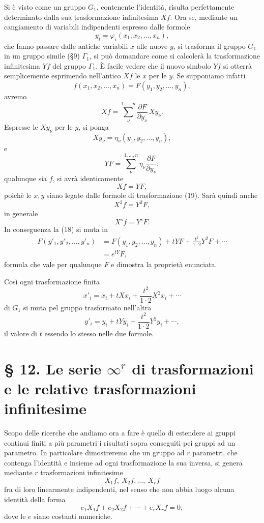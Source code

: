 \documentclass[11pt]{book}
\begin{document}
Si è visto come un gruppo $G_1$, contenente l'identità, risulta perfettamente determinato dalla sua trasformazione infinitesima $Xf$. Ora se, mediante un cangiamento di variabili indipendenti espresso dalle formole
\begin{equation*}\tag{19}
 y_i=\varphi_i(x_1,x_2,\ldots,x_n),
\end{equation*}
che fanno passare dalle antiche variabili $x$ alle nuove $y$, si trasforma il gruppo $G_1$ in un gruppo simile (\S{}9) $\Gamma_1$, si può domandare come si calcolerà la trasformazione infinitesima $Yf$ del gruppo $\Gamma_1$. È facile vedere che il nuovo simbolo $Yf$ si otterrà semplicemente esprimendo nell'antico $Xf$ le $x$ per le $y$. Se supponiamo infatti
\[
 f(x_1,x_2,\ldots,x_n)=F(y_1,y_2,\ldots,y_n),
\]
avremo
\[
 Xf=\sum\limits_\nu^{1,\ldots,n}\frac{\partial F}{\partial y_\nu}\,Xy_\nu.
\]
Espresse le $Xy_\nu$ per le $y$, si ponga
\[
 Xy_\nu=\eta_\nu(y_1,y_2,\ldots,y_n),
\]
e
\[
 YF=\sum\limits_\nu^{1,\ldots,n}\eta_\nu\frac{\partial F}{\partial y_\nu};
\]
qualunque sia $f$, si avrà identicamente
\[
 Xf=YF,
\]
poichè le $x,y$ siano legate dalle formole di trasformazione (19). Sarà quindi anche
\[
 X^2f=Y^2F,
\]
in generale
\[
 X^sf=Y^sF.
\]
In conseguenza la (18) si muta in
\[
\begin{aligned}
 F(y'_1,y'_2,\ldots,y'_n)&=F(y_1,y_2,\ldots,y_n)+tYF+\frac{t^2}{1\cdot2}Y^2F+\cdots\\
 &=e^{tY}F,
\end{aligned}
\]
formula che vale per qualunque $F$ e dimostra la proprietà enunciata.

Così ogni trasformazione finita
\[
 x'_i=x_i+tXx_i+\frac{t^2}{1\cdot2}X^2x_i+\cdots
\]
di $G_1$ si muta pel gruppo trasformato nell'altra
\[
 y'_i=y_i+tYy_i+\frac{t^2}{1\cdot2}Y^2y_i+\cdots,
\]
il valore di $t$ essendo lo stesso nelle due formole.

\section*{\S{} 12. Le serie $\infty^r$ di trasformazioni e le relative trasformazioni infinitesime}

Scopo delle ricerche che andiamo ora a fare è quello di estendere ai gruppi continui finiti a più parametri i risultati sopra conseguiti pei gruppi ad un parametro. In particolare dimostreremo che un gruppo ad $r$ parametri, che contenga l'identità e insieme ad ogni trasformazione la sua inversa, si genera mediante $r$ trasformazioni infinitesime
\[
 X_1f,\ X_2f,\ldots,\ X_rf
\]
fra di loro linearmente indipendenti, nel senso che non abbia luogo alcuna identità della forma
\[
 e_1X_1f+e_2X_2f+\cdots+e_rX_rf=0,
\]
dove le $e$ siano costanti numeriche.
\end{document}
